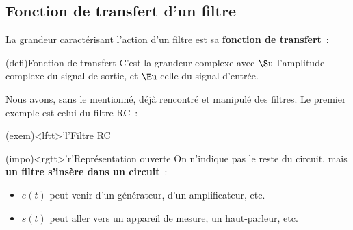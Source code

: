 \documentclass[../../main/main.tex]{subfiles}
\begin{document}
\subsection{Fonction de transfert d'un filtre}

La grandeur caractérisant l'action d'un filtre est sa \textbf{fonction de
	transfert}~:
\begin{tcb*}(defi){Fonction de transfert}
	C'est la grandeur complexe
	\psw{%
		\[
			\Hu = \frac{\Su}{\Eu}
			\Lra
			\Su = \Hu\Eu
		\]
	}%
	avec $\Su$ l'amplitude complexe du signal de sortie, et $\Eu$ celle du signal
	d'entrée.
\end{tcb*}

Nous avons, sans le mentionné, déjà rencontré et manipulé des filtres. Le premier
exemple est celui du filtre RC~:
\begin{tcbraster}[raster columns=2, raster equal height=rows]
	\begin{tcb}(exem)<lftt>'l'{Filtre RC}
		\begin{minipage}{\linewidth}
			\vspace{-15pt}
		\end{minipage}
	\end{tcb}
	\begin{tcb}(impo)<rgtt>'r'{Représentation ouverte}
		On n'indique pas le reste du circuit, mais \textbf{un filtre s'insère
			dans un circuit}~:
		\begin{itemize}
			\item $e(t)$ peut venir d'un générateur, d'un amplificateur, etc.
			\item $s(t)$ peut aller vers un appareil de mesure, un haut-parleur,
			      etc.
		\end{itemize}
	\end{tcb}
\end{tcbraster}
\end{document}
